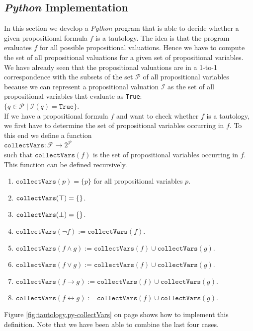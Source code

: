 \subsection{\textsl{Python} Implementation}
In this section we develop a \textsl{Python} program that is able to decide whether a given propositional
formula $f$ is a tautology.  The idea is that the program evaluates $f$ for all possible propositional
valuations.  Hence we have to compute the set of all propositional valuations for a given set of
propositional variables.  We have already seen that the propositional valuations are in a 1-to-1
correspondence with the subsets of the set $\mathcal{P}$ of all propositional variables because we can
represent a propositional valuation $\mathcal{I}$ as the set of all propositional variables that evaluate
as \texttt{True}:
\\[0.2cm]
\hspace*{1.3cm}
$\bigl\{ q \in \mathcal{P} \mid \mathcal{I}(q) = \mathtt{True} \bigr\}$.
\\[0.2cm]
If we have a propositional formula $f$ and want to check whether $f$ is a tautology, we first have to determine
the set of propositional variables occurring in $f$.
To this end we define a function
\\[0.2cm]
\hspace*{1.3cm}
$\texttt{collectVars}: \mathcal{F} \rightarrow 2^{\mathcal{P}}$
\\[0.2cm]
such that $\mathtt{collectVars}(f)$ is the set of propositional variables occurring in $f$.  This function can
be defined recursively.
\begin{enumerate}
\item $\mathtt{collectVars}(p) = \{ p \}$ \quad for all propositional variables $p$.
\item $\mathtt{collectVars}(\top) = \{\}$.
\item $\mathtt{collectVars}(\bot) = \{\}$.
\item $\mathtt{collectVars}(\neg f) := \mathtt{collectVars}(f)$.
\item $\mathtt{collectVars}(f \wedge g) := \mathtt{collectVars}(f) \cup \mathtt{collectVars}(g)$.
\item $\mathtt{collectVars}(f \vee g) := \mathtt{collectVars}(f) \cup \mathtt{collectVars}(g)$.
\item $\mathtt{collectVars}(f \rightarrow g) := \mathtt{collectVars}(f) \cup \mathtt{collectVars}(g)$.
\item $\mathtt{collectVars}(f \leftrightarrow g) := \mathtt{collectVars}(f) \cup \mathtt{collectVars}(g)$.
\end{enumerate}
Figure \ref{fig:tautology.py-collectVars} on page \pageref{fig:tautology.py-collectVars} shows how to implement
this definition.  Note that we have been able to combine the last four cases.

